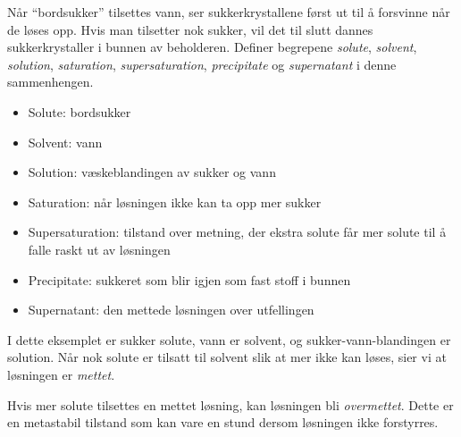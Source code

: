 

Når ``bordsukker'' tilsettes vann, ser sukkerkrystallene først ut til å forsvinne når de løses opp. Hvis man tilsetter nok sukker, vil det til slutt dannes sukkerkrystaller i bunnen av beholderen. Definer begrepene {\it solute}, {\it solvent}, {\it solution}, {\it saturation}, {\it supersaturation}, {\it precipitate} og {\it supernatant} i denne sammenhengen.







\begin{itemize}
\item{} Solute: bordsukker
\item{} Solvent: vann
\item{} Solution: væskeblandingen av sukker og vann
\item{} Saturation: når løsningen ikke kan ta opp mer sukker
\item{} Supersaturation: tilstand over metning, der ekstra solute får mer solute til å falle raskt ut av løsningen
\item{} Precipitate: sukkeret som blir igjen som fast stoff i bunnen
\item{} Supernatant: den mettede løsningen over utfellingen
\end{itemize} 

I dette eksemplet er sukker solute, vann er solvent, og sukker-vann-blandingen er solution. Når nok solute er tilsatt til solvent slik at mer ikke kan løses, sier vi at løsningen er {\it mettet}.

Hvis mer solute tilsettes en mettet løsning, kan løsningen bli {\it overmettet}. Dette er en metastabil tilstand som kan vare en stund dersom løsningen ikke forstyrres.










